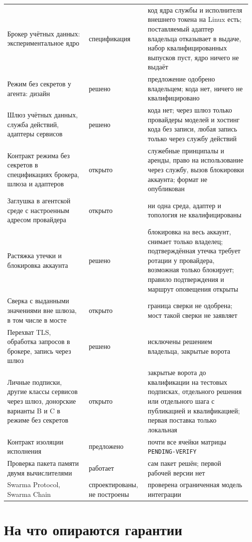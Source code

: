 \documentclass[10pt,a4paper]{article}
\begin{document}
\begin{table}[h]
\begin{tabular}{L{6.3cm}L{2.5cm}L{6.9cm}}
Брокер учётных данных: экспериментальное ядро & спецификация & код ядра службы и исполнителя внешнего токена на Linux есть; поставляемый адаптер владельца отказывает в выдаче, набор квалифицированных выпусков пуст, ядро ничего не выдаёт \\
Режим без секретов у агента: дизайн & решено & предложение одобрено владельцем; кода нет, ничего не квалифицировано \\
Шлюз учётных данных, служба действий, адаптеры сервисов & решено & кода нет; через шлюз только провайдеры моделей и хостинг кода без записи, любая запись только через службу действий \\
Контракт режима без секретов в спецификациях брокера, шлюза и адаптеров & открыто & служебные принципалы и аренды, право на использование через службу, вызов блокировки аккаунта; формат не опубликован \\
Заглушка в агентской среде с настроенным адресом провайдера & открыто & ни одна среда, адаптер и топология не квалифицированы \\
Растяжка утечки и блокировка аккаунта & решено & блокировка на весь аккаунт, снимает только владелец; подтверждённая утечка требует ротации у провайдера, возможная только блокирует; правило подтверждения и маршрут оповещения открыты \\
Сверка с выданными значениями вне шлюза, в том числе в мосте & открыто & граница сверки не одобрена; мост такой сверки не заявляет \\
Перехват TLS, обработка запросов в брокере, запись через шлюз & решено & исключены решением владельца, закрытые ворота \\
Личные подписки, другие классы сервисов через шлюз, донорские варианты B и C в режиме без секретов & открыто & закрытые ворота до квалификации на тестовых подписках, отдельного решения или отдельного шага с публикацией и квалификацией; первая поставка только локальная \\
Контракт изоляции исполнения & предложено & почти все ячейки матрицы \texttt{PENDING-VERIFY} \\
Проверка пакета памяти двумя вычислителями & работает & сам пакет решён; первой рабочей версии нет \\
Swarma Protocol, Swarma Chain & спроектированы, не построены & проверена ограниченная модель интеграции \\
\bottomrule
\end{tabular}
\end{table}

\section{На что опираются гарантии}
\end{document}

